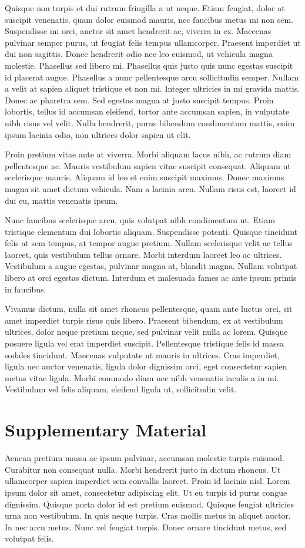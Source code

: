 \documentclass[a4paper,twoside,notitlepage,openright,11pt]{report}
\begin{document}
Quisque non turpis et dui rutrum fringilla a ut neque. Etiam feugiat, dolor at suscipit venenatis, quam dolor euismod mauris, nec faucibus metus mi non sem. Suspendisse mi orci, auctor sit amet hendrerit ac, viverra in ex. Maecenas pulvinar semper purus, ut feugiat felis tempus ullamcorper. Praesent imperdiet ut dui non sagittis. Donec hendrerit odio nec leo euismod, ut vehicula magna molestie. Phasellus sed libero mi. Phasellus quis justo quis nunc egestas suscipit id placerat augue. Phasellus a nunc pellentesque arcu sollicitudin semper. Nullam a velit at sapien aliquet tristique et non mi. Integer ultricies in mi gravida mattis. Donec ac pharetra sem. Sed egestas magna at justo suscipit tempus. Proin lobortis, tellus id accumsan eleifend, tortor ante accumsan sapien, in vulputate nibh risus vel velit. Nulla hendrerit, purus bibendum condimentum mattis, enim ipsum lacinia odio, non ultrices dolor sapien ut elit.

Proin pretium vitae ante at viverra. Morbi aliquam lacus nibh, ac rutrum diam pellentesque ac. Mauris vestibulum sapien vitae suscipit consequat. Aliquam ut scelerisque mauris. Aliquam id leo et enim suscipit maximus. Donec maximus magna sit amet dictum vehicula. Nam a lacinia arcu. Nullam risus est, laoreet id dui eu, mattis venenatis ipsum.

Nunc faucibus scelerisque arcu, quis volutpat nibh condimentum ut. Etiam tristique elementum dui lobortis aliquam. Suspendisse potenti. Quisque tincidunt felis at sem tempus, at tempor augue pretium. Nullam scelerisque velit ac tellus laoreet, quis vestibulum tellus ornare. Morbi interdum laoreet leo ac ultrices. Vestibulum a augue egestas, pulvinar magna at, blandit magna. Nullam volutpat libero at orci egestas dictum. Interdum et malesuada fames ac ante ipsum primis in faucibus.

Vivamus dictum, nulla sit amet rhoncus pellentesque, quam ante luctus orci, sit amet imperdiet turpis risus quis libero. Praesent bibendum, ex at vestibulum ultrices, dolor neque pretium neque, sed pulvinar velit nulla ac lorem. Quisque posuere ligula vel erat imperdiet suscipit. Pellentesque tristique felis id massa sodales tincidunt. Maecenas vulputate ut mauris in ultrices. Cras imperdiet, ligula nec auctor venenatis, ligula dolor dignissim orci, eget consectetur sapien metus vitae ligula. Morbi commodo diam nec nibh venenatis iaculis a in mi. Vestibulum vel felis aliquam, eleifend ligula ut, sollicitudin velit.

\appendix
\chapter{Supplementary Material}
Aenean pretium massa ac ipsum pulvinar, accumsan molestie turpis euismod. Curabitur non consequat nulla. Morbi hendrerit justo in dictum rhoncus. Ut ullamcorper sapien imperdiet sem convallis laoreet. Proin id lacinia nisl. Lorem ipsum dolor sit amet, consectetur adipiscing elit. Ut eu turpis id purus congue dignissim. Quisque porta dolor id est pretium euismod. Quisque feugiat ultricies urna non vestibulum. In quis neque turpis. Cras mollis metus in aliquet auctor. In nec arcu metus. Nunc vel feugiat turpis. Donec ornare tincidunt metus, sed volutpat felis.
\end{document}
